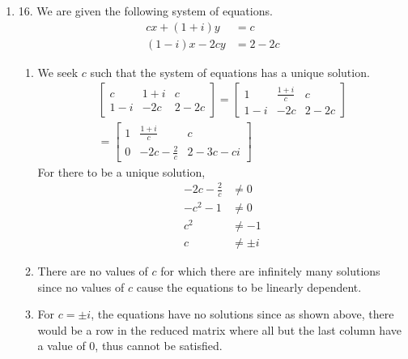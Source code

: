 \documentclass[fleqn]{article}
\newenvironment{answers}{ %
	\begin{enumerate}
		\setlength{\itemsep}{\bigskipamount}
}{\end{enumerate}}
\begin{document}
\begin{answers}
	\item[16.]
		We are given the following system of equations.
		\begin{align*}
			cx + (1 + i)y  & = c \\
			(1 - i)x - 2cy & = 2 - 2c
		\end{align*}
		\begin{enumerate}
			\item
				We seek \(c\) such that the system of equations has a unique solution.
				\begin{gather*}
					\begin{bmatrix}
						c   & 1+i & c    \\
						1-i & -2c & 2-2c
					\end{bmatrix}
					=
					\begin{bmatrix}
						1   & \frac{1+i}{c} & c    \\
						1-i & -2c           & 2-2c
					\end{bmatrix} \\
					=
					\begin{bmatrix}
						1 & \frac{1+i}{c}   & c           \\
						0 & -2c-\frac{2}{c} & 2 - 3c - ci
					\end{bmatrix}
				\end{gather*}
				For there to be a unique solution,
				\begin{align*}
					-2c-\frac{2}{c} & \neq 0 \\
					-c^2 - 1        & \neq 0 \\
					c^2             & \neq -1 \\
					c               & \neq \pm i
				\end{align*}

			\item
				There are no values of \(c\) for which there are infinitely many solutions since no values of \(c\) cause the equations to be linearly dependent.

			\item
				For \(c = \pm i\), the equations have no solutions since as shown above, there would be a row in the reduced matrix where all but the last column have a value of 0, thus cannot be satisfied.
		\end{enumerate}
\end{answers}
\end{document}
